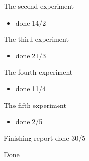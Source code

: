 \documentclass[12pt]{report}
\begin{document}
	The second experiment
	\begin{itemize}
		\item done 14/2
	\end{itemize}
	
	The third experiment
	\begin{itemize}
		\item done 21/3
	\end{itemize}
	
	The fourth experiment
	\begin{itemize}
		\item done 11/4
	\end{itemize}

	The fifth experiment
	\begin{itemize}
		\item done 2/5
	\end{itemize}

	Finishing report done 30/5

	Done 
	
	
	
	
\end{document}
